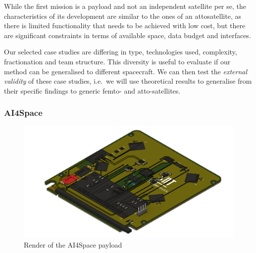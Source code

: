\documentclass[]{iac}
\begin{document}
While the first mission is a payload and not an independent satellite per se, the characteristics of its development are similar to the ones of an attosatellite, as there is limited functionality that needs to be achieved with low cost, but there are significant constraints in terms of available space, data budget and interfaces.

 Our selected case studies are differing in type, technologies used, complexity, fractionation and team structure. This diversity is useful to evaluate if our method can be generalised to different spacecraft.
We can then test the \textit{external validity} \autocite{yin_case_2014} of these case studies, i.e.~we will use theoretical results to generalise from their specific findings to generic femto- and atto-satellites.

\subsubsection{AI4Space}

\begin{figure}[h]
    \centering
    \includegraphics[width=.8\linewidth]{media/Picture1.png}
    \caption{Render of the AI4Space payload}
    \label{fig:ai4space}
\end{figure}
\end{document}
